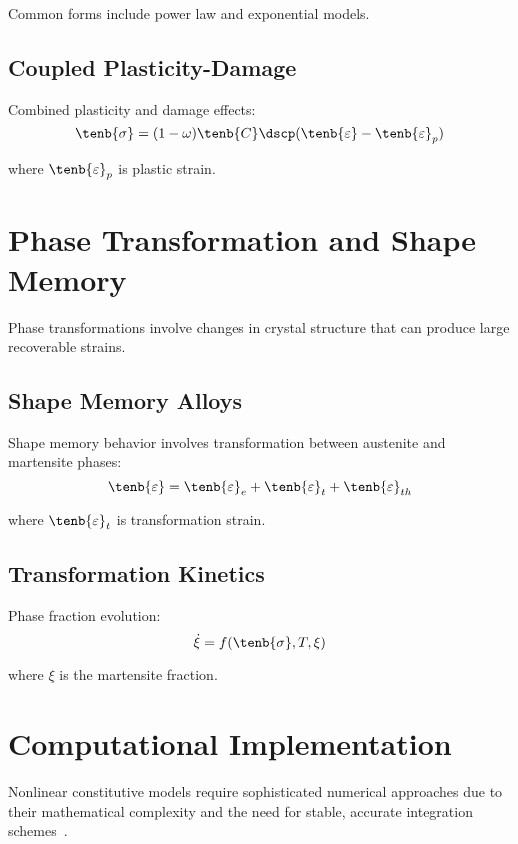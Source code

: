 Common forms include power law and exponential models.

\subsection{Coupled Plasticity-Damage}

Combined plasticity and damage effects:
\begin{equation}
\tenb{\sigma} = (1-\omega) \tenb{C} \dscp (\tenb{\varepsilon} - \tenb{\varepsilon}_p)
\end{equation}

where $\tenb{\varepsilon}_p$ is plastic strain.

\section{Phase Transformation and Shape Memory}

Phase transformations involve changes in crystal structure that can produce large recoverable strains.

\subsection{Shape Memory Alloys}

Shape memory behavior involves transformation between austenite and martensite phases:
\begin{equation}
\tenb{\varepsilon} = \tenb{\varepsilon}_e + \tenb{\varepsilon}_t + \tenb{\varepsilon}_{th}
\end{equation}

where $\tenb{\varepsilon}_t$ is transformation strain.

\subsection{Transformation Kinetics}

Phase fraction evolution:
\begin{equation}
\dot{\xi} = f(\tenb{\sigma}, T, \xi)
\end{equation}

where $\xi$ is the martensite fraction.

\section{Computational Implementation}

Nonlinear constitutive models require sophisticated numerical approaches due to their mathematical complexity and the need for stable, accurate integration schemes~\autocite{Sadd.2019}.

